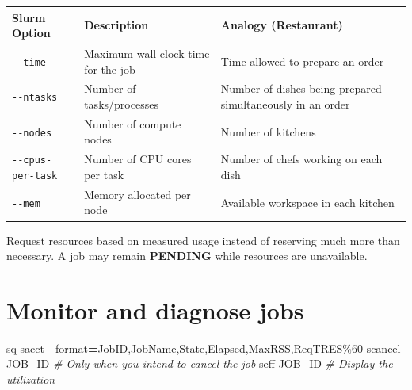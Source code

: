 \documentclass[
]{book}
\newenvironment{Shaded}{\begin{snugshade}}{\end{snugshade}}
\newcommand{\AttributeTok}[1]{\textcolor[rgb]{0.13,0.29,0.53}{#1}}
\newcommand{\CommentTok}[1]{\textcolor[rgb]{0.56,0.35,0.01}{\textit{#1}}}
\newcommand{\ExtensionTok}[1]{#1}
\newcommand{\NormalTok}[1]{#1}
\newcommand{\OperatorTok}[1]{\textcolor[rgb]{0.81,0.36,0.00}{\textbf{#1}}}
\newcounter{none} %
\begin{document}
{\def\LTcaptype{none} %
\begin{longtable}[]{@{}
  >{\raggedright\arraybackslash}p{}
  >{\raggedright\arraybackslash}p{}
  >{\raggedright\arraybackslash}p{}@{}}
\toprule\noalign{}
\begin{minipage}[b]{\linewidth}\raggedright
Slurm Option
\end{minipage} & \begin{minipage}[b]{\linewidth}\raggedright
Description
\end{minipage} & \begin{minipage}[b]{\linewidth}\raggedright
Analogy (Restaurant)
\end{minipage} \\
\midrule\noalign{}
\endhead
\bottomrule\noalign{}
\endlastfoot
\texttt{-\/-time} & Maximum wall-clock time for the job & Time allowed to prepare an order \\
\texttt{-\/-ntasks} & Number of tasks/processes & Number of dishes being prepared simultaneously in an order \\
\texttt{-\/-nodes} & Number of compute nodes & Number of kitchens \\
\texttt{-\/-cpus-per-task} & Number of CPU cores per task & Number of chefs working on each dish \\
\texttt{-\/-mem} & Memory allocated per node & Available workspace in each kitchen \\
\end{longtable}
}

Request resources based on measured usage instead of reserving much more than necessary. A job may remain \textbf{PENDING} while resources are unavailable.

\section{Monitor and diagnose jobs}\label{monitor-and-diagnose-jobs}

\begin{Shaded}
\begin{Highlighting}[]
\ExtensionTok{sq}
\ExtensionTok{sacct} \AttributeTok{{-}{-}format}\OperatorTok{=}\NormalTok{JobID,JobName,State,Elapsed,MaxRSS,ReqTRES\%60}
\ExtensionTok{scancel}\NormalTok{ JOB\_ID                 }\CommentTok{\# Only when you intend to cancel the job}
\ExtensionTok{seff}\NormalTok{ JOB\_ID                     }\CommentTok{\# Display the utilization}
\end{Highlighting}
\end{Shaded}
\end{document}
